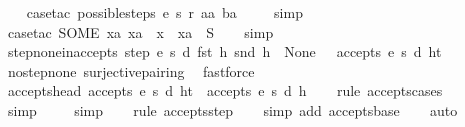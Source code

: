 \begin{isabellebody}
\ \ \isamarkupfalse%
\ {\isacharparenleft}case{\isacharunderscore}tac\ {\isachardoublequoteopen}possible{\isacharunderscore}steps\ e\ s\ r\ aa\ ba{\isachardoublequoteclose}{\isacharparenright}\isanewline
\ \ \ \isamarkupfalse%
\ simp\isanewline
\ \ \isamarkupfalse%
\ {\isacharparenleft}case{\isacharunderscore}tac\ {\isachardoublequoteopen}SOME\ xa{\isachardot}\ xa\ {\isacharequal}\ x\ {\isasymor}\ xa\ {\isacharbar}{\isasymin}{\isacharbar}\ S{\isacharprime}{\isachardoublequoteclose}{\isacharparenright}\isanewline
\ \ \isamarkupfalse%
\ simp%
\endisatagproof
{\isafoldproof}%
%
\isadelimproof
\isanewline
%
\endisadelimproof
\isanewline
{}\isamarkupfalse%
\ step{\isacharunderscore}none{\isacharunderscore}inaccepts{\isacharcolon}\ {\isachardoublequoteopen}{\isacharparenleft}{\isacharparenleft}step\ e\ s\ d\ {\isacharparenleft}fst\ h{\isacharparenright}\ {\isacharparenleft}snd\ h{\isacharparenright}{\isacharparenright}\ {\isacharequal}\ None{\isacharparenright}\ {\isasymLongrightarrow}\ {\isasymnot}\ {\isacharparenleft}accepts\ e\ s\ d\ {\isacharparenleft}h{\isacharhash}t{\isacharparenright}{\isacharparenright}{\isachardoublequoteclose}\isanewline
%
\isadelimproof
\ \ %
\endisadelimproof
%
\isatagproof
{}\isamarkupfalse%
\ no{\isacharunderscore}step{\isacharunderscore}none\ surjective{\isacharunderscore}pairing\ \isamarkupfalse%
\ fastforce%
\endisatagproof
{\isafoldproof}%
%
\isadelimproof
\isanewline
%
\endisadelimproof
\isanewline
{}\isamarkupfalse%
\ accepts{\isacharunderscore}head{\isacharcolon}\ {\isachardoublequoteopen}accepts\ e\ s\ d\ {\isacharparenleft}h{\isacharhash}t{\isacharparenright}\ {\isasymLongrightarrow}\ accepts\ e\ s\ d\ {\isacharbrackleft}h{\isacharbrackright}{\isachardoublequoteclose}\isanewline
%
\isadelimproof
\ \ %
\endisadelimproof
%
\isatagproof
{}\isamarkupfalse%
\ {\isacharparenleft}rule\ accepts{\isachardot}cases{\isacharparenright}\isanewline
\ \ \ \ \isamarkupfalse%
\ simp\isanewline
\ \ \ \isamarkupfalse%
\ simp\isanewline
\ \ \isamarkupfalse%
\ {\isacharparenleft}rule\ accepts{\isachardot}step{\isacharparenright}\isanewline
\ \ \isamarkupfalse%
\ {\isacharparenleft}simp\ add{\isacharcolon}\ accepts{\isachardot}base{\isacharparenright}\isanewline
\ \ \isamarkupfalse%
\ auto%
\endisatagproof
{\isafoldproof}%
%
\isadelimproof
\isanewline
%
\endisadelimproof
\isanewline
{}\isamarkupfalse%

\end{isabellebody}
